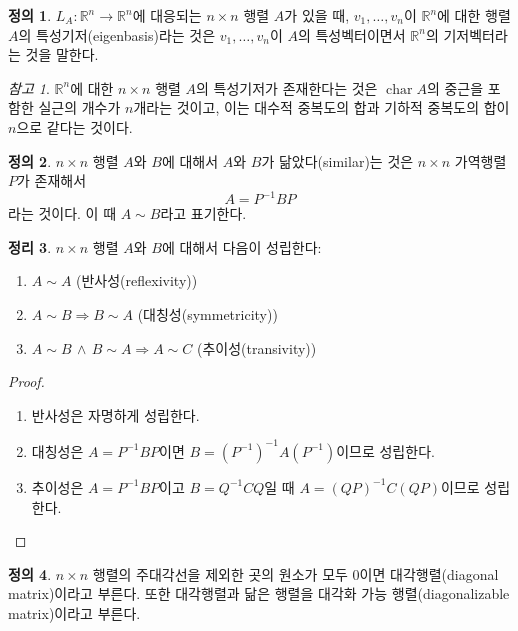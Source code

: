 \documentclass[unfonts,oneside,a4paper]{oblivoir}
\theoremstyle{definition}
\newtheorem{definition}{정의}[section]
\theoremstyle{theorem}
\newtheorem{theorem}[definition]{정리}
\theoremstyle{theorem}
\theoremstyle{remark}
\newtheorem*{remark}{참고}
\theoremstyle{remark}
\theoremstyle{remark}
\theoremstyle{remark}
\renewcommand{\vec}[1]{\bm{\mathit{#1}}}
\DeclareMathOperator{\Char}{char}
\begin{document}
\begin{definition}
    $L_A: \mathbb R^n \rightarrow \mathbb R^n$에 대응되는 $n \times n$ 행렬 $A$가 있을 때, $\vec v_1, \dots, \vec v_n$이 $\mathbb R^n$에 대한 행렬 $A$의 특성기저(eigenbasis)라는 것은 $\vec v_1, \dots, \vec v_n$이 $A$의 특성벡터이면서 $\mathbb R^n$의 기저벡터라는 것을 말한다.
\end{definition}

\begin{remark}
    $\mathbb R^n$에 대한 $n \times n$ 행렬 $A$의 특성기저가 존재한다는 것은 $\Char A$의 중근을 포함한 실근의 개수가 $n$개라는 것이고, 이는 대수적 중복도의 합과 기하적 중복도의 합이 $n$으로 같다는 것이다.
\end{remark}

\begin{definition}
    $n \times n$ 행렬 $A$와 $B$에 대해서 $A$와 $B$가 닮았다(similar)는 것은 $n \times n$ 가역행렬 $P$가 존재해서
    \begin{equation*}
        A = P^{-1} B P
    \end{equation*}
    라는 것이다.
    이 때 $A \sim B$라고 표기한다.
\end{definition}

\begin{theorem}
    $n \times n$ 행렬 $A$와 $B$에 대해서 다음이 성립한다:
    \begin{enumerate}
        \item $A \sim A$ (반사성(reflexivity))
        \item $A \sim B \Rightarrow B \sim A$ (대칭성(symmetricity))
        \item $A \sim B \,\wedge\, B \sim A \Rightarrow A \sim C$ (추이성(transivity))
    \end{enumerate}
\end{theorem}

\begin{proof}
    \leavevmode
    \begin{enumerate}
        \item 반사성은 자명하게 성립한다.
        \item 대칭성은 $A = P^{-1} B P$이면 $B = (P^{-1})^{-1} A (P^{-1})$이므로 성립한다.
        \item 추이성은 $A = P^{-1}BP$이고 $B = Q^{-1} C Q$일 때 $A = (QP)^{-1} C (QP)$이므로 성립한다.
    \end{enumerate}
\end{proof}

\begin{definition}
    $n \times n$ 행렬의 주대각선을 제외한 곳의 원소가 모두 0이면 대각행렬(diagonal matrix)이라고 부른다.
    또한 대각행렬과 닮은 행렬을 대각화 가능 행렬(diagonalizable matrix)이라고 부른다.
\end{definition}
\end{document}
